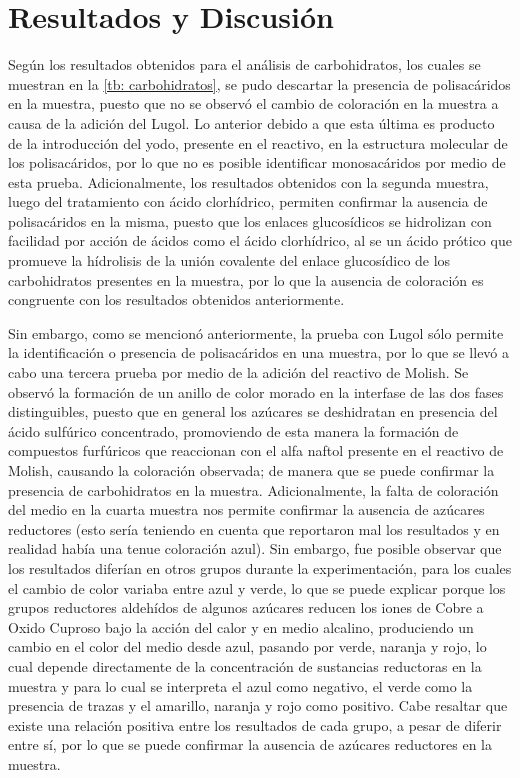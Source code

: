 \documentclass[fleqn,10pt]{SelfArx}
\begin{document}
	
	
\section{Resultados y Discusi\'on}
	Según los resultados obtenidos para el análisis de carbohidratos, los cuales se muestran en la \autoref{tb: carbohidratos}, se pudo descartar la presencia de polisacáridos en la muestra, puesto que no se observó el cambio de coloración en la muestra a causa de la adición del Lugol. Lo anterior debido a que esta última es producto de la introducción del yodo, presente en el reactivo, en la estructura molecular de los polisacáridos, por lo que no es posible identificar monosacáridos por medio de esta prueba. Adicionalmente, los resultados obtenidos con la segunda muestra, luego del tratamiento con ácido clorhídrico, permiten confirmar la ausencia de polisacáridos en la misma, puesto que los enlaces glucosídicos se hidrolizan con facilidad por acción de ácidos como el ácido clorhídrico, al se un ácido prótico que promueve la hídrolisis de la unión covalente del enlace glucosídico de los carbohidratos presentes en la muestra, por lo que la ausencia de coloración es congruente con los resultados obtenidos anteriormente. 
	
	Sin embargo, como se mencionó anteriormente, la prueba con Lugol sólo permite la identificación o presencia de polisacáridos en una muestra, por lo que se llevó a cabo una tercera prueba por medio de la adición del reactivo de Molish. Se observó la formación de un anillo de color morado en la interfase de las dos fases distinguibles, puesto que en general los azúcares se deshidratan en presencia del ácido sulfúrico concentrado, promoviendo de esta manera la formación de compuestos furfúricos que reaccionan con el alfa naftol presente en el reactivo de Molish, causando la coloración observada; de manera que se puede confirmar la presencia de carbohidratos en la muestra. Adicionalmente, la falta de coloración del medio en la cuarta muestra nos permite confirmar la ausencia de azúcares reductores (esto sería teniendo en cuenta que reportaron mal los resultados y en realidad había una tenue coloración azul). Sin embargo, fue posible observar que los resultados diferían en otros grupos durante la experimentación, para los cuales el cambio de color variaba entre azul y verde, lo que se puede explicar porque los grupos reductores aldehídos de algunos azúcares reducen los iones de Cobre a Oxido Cuproso bajo la acción del calor y en medio alcalino, produciendo un cambio en el color del medio desde azul, pasando por verde, naranja y rojo, lo cual depende directamente de la concentración de sustancias reductoras en la muestra y para lo cual se interpreta el azul como negativo, el verde como la presencia de trazas y el amarillo, naranja y rojo como positivo. Cabe resaltar que existe una relación positiva entre los resultados de cada grupo, a pesar de diferir entre sí, por lo que se puede confirmar la ausencia de azúcares reductores en la muestra.
	
\end{document}
